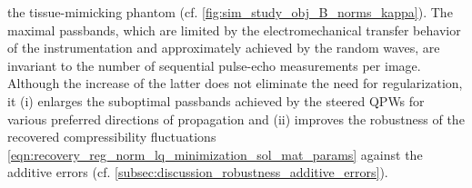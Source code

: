 the tissue-mimicking phantom
(cf. \cref{fig:sim_study_obj_B_norms_kappa}).
The maximal passbands, which are limited by
the electromechanical transfer behavior of
the instrumentation and approximately achieved by
the random waves, are invariant to
the number of
sequential pulse-echo measurements per image.
Although
the increase of
the latter does not eliminate
the need for
regularization,
it (i) enlarges
the suboptimal passbands achieved by
the steered \acp{QPW} for
various preferred directions of
propagation and
%
(ii) improves
the robustness of
the recovered compressibility fluctuations
\eqref{eqn:recovery_reg_norm_lq_minimization_sol_mat_params} against
the additive errors
(cf. \cref{subsec:discussion_robustness_additive_errors}).
